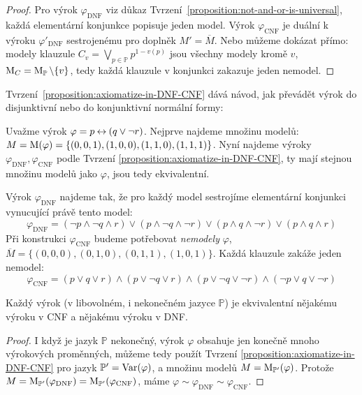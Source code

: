 \begin{proof}
    Pro výrok $\varphi_{\mathrm{DNF}}$ viz důkaz Tvrzení~\ref{proposition:not-and-or-is-universal}, každá elementární konjunkce popisuje jeden model. Výrok $\varphi_{\mathrm{CNF}}$ je duální k výroku $\varphi'_{\mathrm{DNF}}$ sestrojenému pro doplněk $M'=\overline{M}$. Nebo můžeme dokázat přímo: modely klauzule $C_v=\bigvee_{p\in\mathbb P}p^{1-v(p)}$ jsou všechny modely kromě $v$, $\operatorname{M}_C=\operatorname{M}_\mathbb P\setminus\{v\}$, tedy každá klauzule v konjunkci zakazuje jeden nemodel.
\end{proof}

Tvrzení~\ref{proposition:axiomatize-in-DNF-CNF} dává návod, jak převádět výrok do disjunktivní nebo do konjunktivní normální formy:

\begin{example}
    Uvažme výrok $\varphi=p\mathbin{\leftrightarrow} (q\lor \neg r)$. Nejprve najdeme množinu modelů: $M=\operatorname{M}(\varphi)=\{(0,0,1),(1,0,0),(1,1,0),(1,1,1)\}$. Nyní najdeme výroky $\varphi_{\mathrm{DNF}},\varphi_{\mathrm{CNF}}$ podle Tvrzení \ref{proposition:axiomatize-in-DNF-CNF}, ty mají stejnou množinu modelů jako $\varphi$, jsou tedy ekvivalentní.

    Výrok $\varphi_{\mathrm{DNF}}$ najdeme tak, že pro každý model sestrojíme elementární konjunkci vynucující právě tento model:
    $$
    \varphi_{\mathrm{DNF}}=(\neg p\land\neg q\land r)\lor (p\land\neg q\land\neg r) \lor (p\land q\land\neg r)\lor (p\land q\land r)
    $$
    Při konstrukci $\varphi_{\mathrm{CNF}}$ budeme potřebovat \emph{nemodely} $\varphi$, $\overline{M}=\{(0,0,0),(0,1,0),(0,1,1),(1,0,1)\}$. Každá klauzule zakáže jeden nemodel:
    $$
    \varphi_{\mathrm{CNF}}=(p\lor q\lor r)\land (p\lor\neg q\lor r) \land (p\lor \neg q\lor\neg r)\land (\neg p\lor q\lor\neg r)
    $$   
\end{example}

\begin{corollary}
    Každý výrok (v libovolném, i nekonečném jazyce $\mathbb P$) je ekvivalentní nějakému výroku v CNF a nějakému výroku v DNF.
\end{corollary}
\begin{proof}
I když je jazyk $\mathbb P$ nekonečný, výrok $\varphi$ obsahuje jen konečně mnoho výrokových proměnných, můžeme tedy použít Tvrzení \ref{proposition:axiomatize-in-DNF-CNF} pro jazyk $\mathbb P'=\operatorname{Var}(\varphi)$, a množinu modelů $M=\operatorname{M}_{\mathbb P'}(\varphi)$. Protože $M=\operatorname{M}_{\mathbb P'}(\varphi_{\mathrm{DNF}})=\operatorname{M}_{\mathbb P'}(\varphi_{\mathrm{CNF}})$, máme $\varphi\sim\varphi_{\mathrm{DNF}}\sim\varphi_{\mathrm{CNF}}$.
\end{proof}

